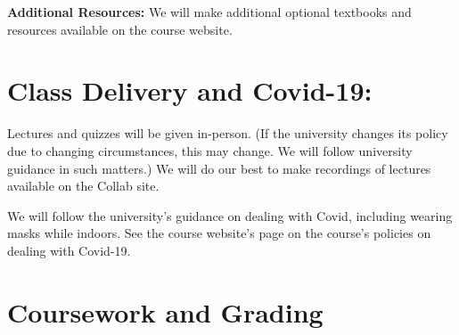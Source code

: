 \documentclass[12pt]{article}
\begin{document}
\textbf{Additional Resources:} We will make additional optional textbooks and resources available on the course website.

\section*{Class Delivery and Covid-19:}

Lectures and quizzes will be given in-person.  (If the university changes its policy due to changing circumstances, this may change. We will follow university guidance in such matters.) We will do our best to make recordings of lectures available on the Collab site.

We will follow the university's guidance on dealing with Covid, including wearing masks while indoors. See the course website's page on the course's policies on dealing with Covid-19.



\section*{Coursework and Grading}
\end{document}
